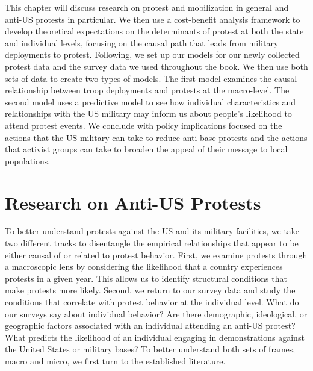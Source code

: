 		This chapter will discuss research on protest and mobilization in general and anti-US protests in particular. We then use a cost-benefit analysis framework to develop theoretical expectations on the determinants of protest at both the state and individual levels, focusing on the causal path that leads from military deployments to protest. Following, we set up our models for our newly collected protest data and the survey data we used throughout the book. We then use both sets of data to create two types of models. The first model examines the causal relationship between troop deployments and protests at the macro-level. The second model uses a predictive model to see how individual characteristics and relationships with the US military may inform us about people's likelihood to attend protest events. We conclude with policy implications focused on the actions that the US military can take to reduce anti-base protests and the actions that activist groups can take to broaden the appeal of their message to local populations. 
		
		\section*{Research on Anti-US Protests}
		
		To better understand protests against the US and its military facilities, we take two different tracks to disentangle the empirical relationships that appear to be either causal of or related to protest behavior. First, we examine protests through a macroscopic lens by considering the likelihood that a country experiences protests in a given year. This allows us to identify structural conditions that make protests more likely. Second, we return to our survey data and study the conditions that correlate with protest behavior at the individual level. What do our surveys say about individual behavior? Are there demographic, ideological, or geographic factors associated with an individual attending an anti-US protest? What predicts the likelihood of an individual engaging in demonstrations against the United States or military bases? To better understand both sets of frames, macro and micro, we first turn to the established literature.
		
